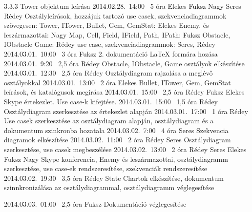 \begin{naplo}
{ 3.3.3  Tower objektum leírása}
\bejegyzes
{2014.02.28.~14:00~}
{5 óra}
{Elekes\newline
Fuksz\newline
Nagy\newline
Seres\newline
Rédey}
{Osztályleírások, hozzájuk tartozó use casek, szekvenciadiagrammok szövegesen:\newline
Tower, ITower, Bullet, Gem, GemStat: Elekes\newline
Enemy, és leszármazottai: Nagy\newline
Map, Cell, Field, IField, Path, IPath: Fuksz\newline
Obstacle, IObstacle Game: Rédey\newline
use case, szekvenciadiagrammok: Seres, Rédey}
\bejegyzes
{2014.03.01.~10:00~}
{3 óra}
{Fuksz}
{2. dokumentáció \LaTeX{} formára hozása}
\bejegyzes
{2014.03.01.~9:20~}
{2,5 óra}
{Rédey}
{Obstacle, IObstacle, Game osztályok elkészítése}
\bejegyzes
{2014.03.01.~12:30~}
{2,5 óra}
{Rédey}
{Osztálydiagram rajzolása a meglévő osztályokkal}
\bejegyzes
{2014.03.01.~13:00~}
{2 óra}
{Elekes}
{Bullet, ITower, Gem, GemStat leírások, és katalógusok megírása}
\bejegyzes
{2014.03.01.~15:00~}
{2,5 óra}
{Rédey\newline
Fuksz\newline
Elekes}
{Skype értekezlet.\newline
Use case-k kifejtése.}
\bejegyzes
{2014.03.01.~15:00~}
{1,5 óra}
{Rédey}
{Osztálydiagram szerkesztése az értekezlet alapján}
\bejegyzes
{2014.03.01.~17:00~}
{1 óra}
{Rédey}
{Use casek szerkesztése az osztálydiagram alapján, osztálydiagram és a dokumentum szinkronba hozatala}
\bejegyzes
{2014.03.02.~7:00~}
{4 óra}
{Seres}
{Szekvencia diagramok elkészítése}
\bejegyzes
{2014.03.02.~11:00~}
{2 óra}
{Rédey\newline
Seres}
{Osztálydiagram szerkesztése, use casek megbeszélése}
\bejegyzes
{2014.03.02.~13:00~}
{2 óra}
{Rédey\newline
Seres\newline
Elekes\newline
Fuksz\newline
Nagy}
{Skype konferencia, Enemy és leszármazottai, osztálydiagramm szerkesztése, use case-ek rendszeresítése, szekvenciák rendszeresítése}
\bejegyzes
{2014.03.02.~19:30~}
{3,5 óra}
{Rédey}
{State Chartok elkészítése, dokumentum szinnkronizálása az osztálydiagrammal, osztálydiagramm véglegesítése}
		
\bejegyzes
{2014.03.03.~01:00~}
{2,5 óra}
{Fuksz}
{Dokumentáció véglegesítése}	
		
 			
			
			
			
			
			
			

\end{naplo}

